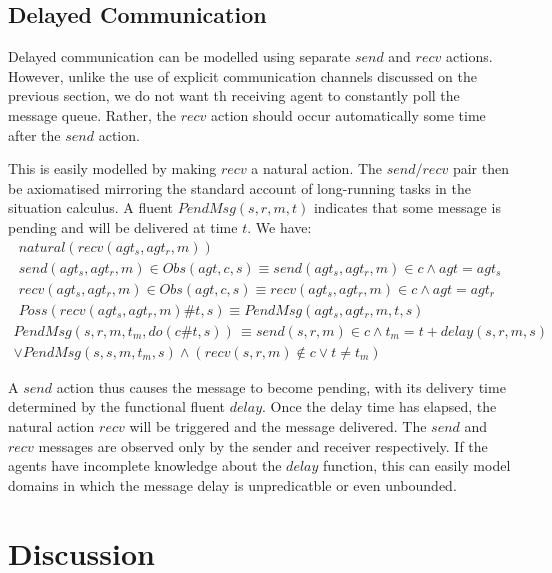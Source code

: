 \subsection{Delayed Communication}

Delayed communication can be modelled using separate $send$ and $recv$
actions. However, unlike the use of explicit communication channels
discussed on the previous section, we do not want th receiving agent
to constantly poll the message queue. Rather, the $recv$ action should
occur automatically some time after the $send$ action.

This is easily modelled by making $recv$ a natural action. The $send/recv$
pair then be axiomatised mirroring the standard account of long-running
tasks in the situation calculus. A fluent $PendMsg(s,r,m,t)$ indicates
that some message is pending and will be delivered at time $t$. We
have:\begin{gather*}
natural(recv(agt_{s},agt_{r},m))\\
send(agt_{s},agt_{r},m)\in Obs(agt,c,s)\equiv send(agt_{s},agt_{r},m)\in c\wedge agt=agt_{s}\\
recv(agt_{s},agt_{r},m)\in Obs(agt,c,s)\equiv recv(agt_{s},agt_{r},m)\in c\wedge agt=agt_{r}\\
Poss(recv(agt_{s},agt_{r},m)\#t,s)\equiv PendMsg(agt_{s},agt_{r},m,t,s)\end{gather*}
\begin{multline*}
PendMsg(s,r,m,t_{m},do(c\#t,s))\,\equiv send(s,r,m)\in c\wedge t_{m}=t+delay(s,r,m,s)\\
\vee PendMsg(s,s,m,t_{m},s)\wedge\left(recv(s,r,m)\not\in c\vee t\neq t_{m}\right)\end{multline*}


A $send$ action thus causes the message to become pending, with its
delivery time determined by the functional fluent $delay$. Once the
delay time has elapsed, the natural action $recv$ will be triggered
and the message delivered. The $send$ and $recv$ messages are observed
only by the sender and receiver respectively. If the agents have incomplete
knowledge about the $delay$ function, this can easily model domains
in which the message delay is unpredicatble or even unbounded.


\section{Discussion\label{sec:Observations:Discussion}}

